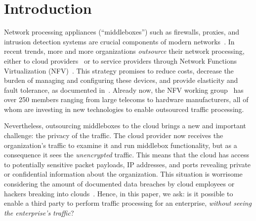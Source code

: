 

\section{Introduction}\label{sec:intro}


    Network processing appliances (``middleboxes'') such as firewalls, proxies, and intrusion detection systems are crucial components of modern networks~\cite{aplomb}. 
     In recent trends, more and more organizations {\it outsource} their network processing, either to cloud providers~\cite{aplomb, aryaka, zscalar} or to service providers through Network Functions Virtualization (NFV)~\cite{nfv}. This strategy promises to reduce costs, decrease the burden of managing and configuring these devices, and provide elasticity and fault tolerance, as documented in~\cite{aplomb}.
Already now, the NFV working group~\cite{nfvwg} has over 250 members ranging from large telecoms to hardware manufacturers, all of whom are investing in new technologies to enable outsourced traffic processing.
   
   Nevertheless, outsourcing middleboxes to the cloud brings a new and important challenge: the privacy of the traffic. The cloud provider now receives  the organization's traffic to examine it and run middlebox functionality, but as a consequence it sees the {\em unencrypted} traffic. This means that the cloud has access to potentially sensitive packet payloads,  IP addresses, and ports revealing private or confidential information about the organization. This situation is worrisome considering the amount of documented data breaches by cloud employees or hackers breaking into clouds~\cite{XXX}.
   Hence, in this paper, we ask: is it possible to enable a third party to perform traffic processing for an enterprise, {\em without seeing the enterprise's traffic}?
   
   
   


